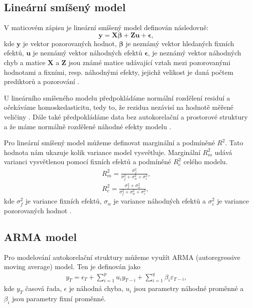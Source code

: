 \subsection{Lineární smíšený model}\label{chap:lme}
V maticovém zápisu je lineární smíšený model definován následovně: \parencite{mcleanrobert1991}
$$\boldsymbol{y} = \boldsymbol{X}\boldsymbol{\beta} + \boldsymbol{Z}\boldsymbol{u} + \boldsymbol{\epsilon},$$ \label{eq:linearmixedeffectmodel}
kde $\mathbf{y}$ je vektor pozorovaných hodnot, $\mathbf{\beta}$ je neznámý vektor hledaných fixních efektů, $\mathbf{u}$ je neznámý vektor náhodných efektů $\mathbf{\epsilon}$, je neznámý vektor náhodných chyb a matice $\mathbf{X}$ a $\mathbf{Z}$ jsou známé matice udávající vztah mezi pozorovanými hodnotami a fixními, resp. náhodnými efekty, jejichž velikost je daná počtem prediktorů a pozorování \parencite{mcleanrobert1991}.

U lineárního smíšeného modelu předpokládáme normální rozdělení residuí a očekáváme homoskedasticitu, tedy to, že rezidua nezávisí na hodnotě měřené veličiny \parencite{homoscedasticity}. Dále také předpokládáme data bez autokorelační a prostorové struktury a že máme normálně rozdělené náhodné efekty modelu \parencite{hefleytrevorj2017}. 

Pro lineární smíšený model můžeme definovat marginální a podmíněné $R^2$. Tato hodnota nám ukazuje kolik variance model vysvětluje. Marginální $R_m^2$ udává varianci vysvětlenou pomocí fixních efektů a podmíněné $R_c^2$ celého modelu.
\begin{gather}
	R_m^2 = \frac{\sigma_f^2}{\sigma_f^2+\sigma_{\alpha}^2+\sigma_{\varepsilon}^2},\\
	R_c^2 = \frac{\sigma_f^2+\sigma_{\alpha}^2}{\sigma_f^2+\sigma_{\alpha}^2+\sigma_{\varepsilon}^2},
\end{gather}
kde $\sigma_f^2$ je variance fixních efektů, $\sigma_{\alpha}$ je variance náhodných efektů a $\sigma_{\varepsilon}^2$ je variance pozorovaných hodnot \parencite{lmersquared}.

\subsection{ARMA model}
Pro modelování autokorelační struktury můžeme využít ARMA (autoregressive moving average) model. Ten je definován jako \parencite{wilsongranville2016}
\begin{gather*}
y_T = \epsilon_T + \sum_{i=1}^{p}u_i y_{T-i} + \sum_{i=1}^{q}\beta_i\varepsilon_{T-i},
\end{gather*}
kde $y_T$ časová řada, $\epsilon$ je náhodná chyba, $u_i$ jsou parametry náhodné proměnné a $\beta_i$ jsou parametry fixní proměnné. 

